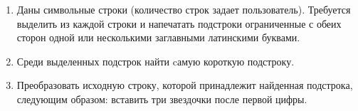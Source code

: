 \begin{enumerate}
    \item Даны символьные строки (количество строк задает пользователь). Требуется выделить из каждой строки и напечатать подстроки ограниченные с обеих сторон одной или несколькими заглавными латинскими буквами.
    \item Среди выделенных подстрок найти cамую короткую подстроку.
    \item Преобразовать исходную строку, которой принадлежит найденная подстрока, следующим образом: вставить три звездочки после первой цифры.
\end{enumerate}
